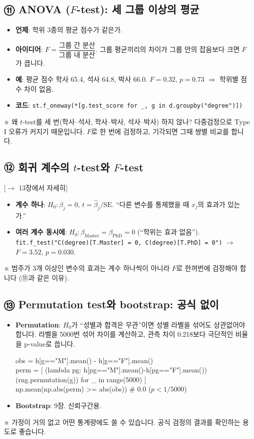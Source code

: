 \documentclass[11pt,a4paper]{article}
\newcommand{\SE}{\mathrm{SE}}
\newcommand{\code}[1]{\texttt{#1}}
\newcommand{\aside}[1]{{\footnotesize\color{black!65}#1}}
\newcommand{\fwd}[1]{{\footnotesize\textsf{\color{green!40!black}[$\to$ #1에서 자세히]}}}
\begin{document}
\subsection*{⑪ ANOVA ($F$-test): 세 그룹 이상의 평균}
\begin{itemize}
\item \textbf{언제}: 학위 3종의 평균 점수가 같은가.
\item \textbf{아이디어}: $F=\dfrac{\text{그룹 간 분산}}{\text{그룹 내 분산}}$. 그룹 평균끼리의 차이가 그룹 안의 잡음보다 크면 $F$가 큽니다.
\item \textbf{예}: 평균 점수 학사 65.4, 석사 64.8, 박사 66.0. $F=0.32$, $p=0.73$ $\Rightarrow$ 학위별 점수 차이 없음.
\item \textbf{코드}: \code{st.f\_oneway(*[g.test\_score for \_, g in d.groupby("degree")])}
\end{itemize}
\aside{※ 왜 $t$-test를 세 번(학사–석사, 학사–박사, 석사–박사) 하지 않나? 다중검정으로 Type I 오류가 커지기 때문입니다. $F$로 한 번에 검정하고, 기각되면 그때 쌍별 비교를 합니다.}

\subsection*{⑫ 회귀 계수의 $t$-test와 $F$-test} \fwd{13장}
\begin{itemize}
\item \textbf{계수 하나}: $H_0:\beta_j=0$, $t=\hat\beta_j/\SE$. ``다른 변수를 통제했을 때 $x_j$의 효과가 있는가.''
\item \textbf{여러 계수 동시에}: $H_0:\beta_{\text{Master}}=\beta_{\text{PhD}}=0$ (``학위는 효과 없음''). \code{fit.f\_test("C(degree)[T.Master] = 0, C(degree)[T.PhD] = 0")} $\to$ $F=3.52$, $p=0.030$.
\end{itemize}
\aside{※ 범주가 3개 이상인 변수의 효과는 계수 하나씩이 아니라 $F$로 한꺼번에 검정해야 합니다 (⑪과 같은 이유).}

\subsection*{⑬ Permutation test와 bootstrap: 공식 없이}
\begin{itemize}
\item \textbf{Permutation}: $H_0$가 ``성별과 합격은 무관''이면 성별 라벨을 섞어도 상관없어야 합니다. 라벨을 5000번 섞어 차이를 계산하고, 관측 차이 0.218보다 극단적인 비율을 p-value로 씁니다.
\begin{codebox}
obs = h[g=="M"].mean() - h[g=="F"].mean()\\
perm = [ (lambda pg: h[pg=="M"].mean()-h[pg=="F"].mean())(rng.permutation(g)) for \_ in range(5000) ]\\
np.mean(np.abs(perm) >= abs(obs)) \hfill \# 0.0  ($p<1/5000$)
\end{codebox}
\item \textbf{Bootstrap}: 9장. 신뢰구간용.
\end{itemize}
\aside{※ 가정이 거의 없고 어떤 통계량에도 쓸 수 있습니다. 공식 검정의 결과를 확인하는 용도로 좋습니다.}
\end{document}
